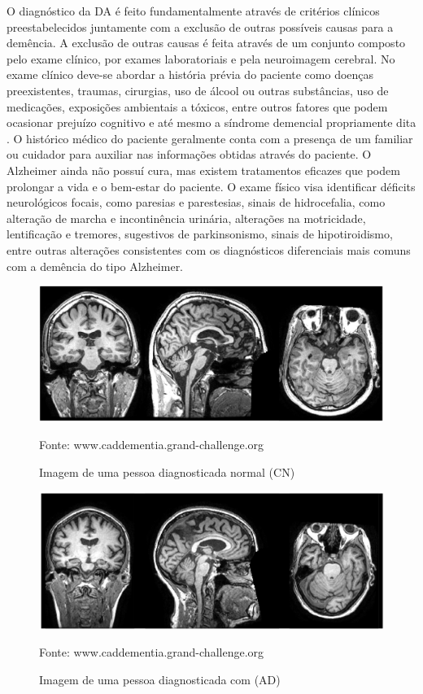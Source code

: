 \documentclass[openright]{UFRGS} %
\begin{document}
O diagnóstico da DA é feito fundamentalmente através de critérios clínicos preestabelecidos juntamente com a exclusão de outras possíveis causas para a demência. A exclusão de outras causas é feita através de um conjunto composto pelo exame clínico, por exames
laboratoriais e pela neuroimagem cerebral. No exame clínico deve-se abordar a história prévia do paciente como doenças preexistentes, traumas, cirurgias, uso de
álcool ou outras substâncias, uso de medicações, exposições ambientais a tóxicos, entre outros fatores que podem ocasionar prejuízo cognitivo e até mesmo a síndrome demencial propriamente dita \cite{aprahamian2009doencca}. O histórico médico do paciente geralmente
conta com a presença de um familiar ou cuidador para
auxiliar nas informações obtidas através do paciente.
O Alzheimer ainda não  possuí cura, mas existem tratamentos eficazes que podem prolongar a vida e o bem-estar do paciente. O exame físico visa identificar déficits neurológicos focais,
como paresias e parestesias, sinais de hidrocefalia, como
alteração de marcha e incontinência urinária, alterações
na motricidade, lentificação e tremores, sugestivos de
parkinsonismo, sinais de hipotiroidismo, entre outras
alterações consistentes com os diagnósticos diferenciais
mais comuns com a demência do tipo Alzheimer.



\begin{figure}[h]
    \centering
    \caption{Imagem de uma pessoa diagnosticada normal (CN)}
    \includegraphics[scale=0.31]{acNormal.png}
    \centerline{Fonte: www.caddementia.grand-challenge.org}
    \label{fig:acNormal}
\end{figure}

\begin{figure}[h]
    \centering
    \caption{Imagem de uma pessoa diagnosticada com (AD)}
    \includegraphics[scale=0.35]{adAlzhaimer.png}
    \centerline{Fonte: www.caddementia.grand-challenge.org}
    \label{fig:adAlzhaimer}
\end{figure}
\end{document}
